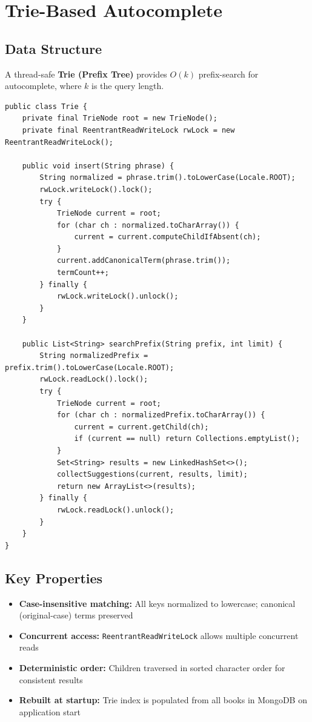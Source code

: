 \documentclass[12pt,a4paper]{report}
\begin{document}
\section{Trie-Based Autocomplete}

\subsection{Data Structure}
A thread-safe \textbf{Trie (Prefix Tree)} provides $O(k)$ prefix-search for autocomplete, where $k$ is the query length.

\begin{lstlisting}[style=JavaStyle, caption={Trie.java -- Thread-Safe Prefix Tree}]
public class Trie {
    private final TrieNode root = new TrieNode();
    private final ReentrantReadWriteLock rwLock = new ReentrantReadWriteLock();

    public void insert(String phrase) {
        String normalized = phrase.trim().toLowerCase(Locale.ROOT);
        rwLock.writeLock().lock();
        try {
            TrieNode current = root;
            for (char ch : normalized.toCharArray()) {
                current = current.computeChildIfAbsent(ch);
            }
            current.addCanonicalTerm(phrase.trim());
            termCount++;
        } finally {
            rwLock.writeLock().unlock();
        }
    }

    public List<String> searchPrefix(String prefix, int limit) {
        String normalizedPrefix = prefix.trim().toLowerCase(Locale.ROOT);
        rwLock.readLock().lock();
        try {
            TrieNode current = root;
            for (char ch : normalizedPrefix.toCharArray()) {
                current = current.getChild(ch);
                if (current == null) return Collections.emptyList();
            }
            Set<String> results = new LinkedHashSet<>();
            collectSuggestions(current, results, limit);
            return new ArrayList<>(results);
        } finally {
            rwLock.readLock().unlock();
        }
    }
}
\end{lstlisting}

\subsection{Key Properties}
\begin{itemize}[noitemsep]
    \item \textbf{Case-insensitive matching:} All keys normalized to lowercase; canonical (original-case) terms preserved
    \item \textbf{Concurrent access:} \texttt{ReentrantReadWriteLock} allows multiple concurrent reads
    \item \textbf{Deterministic order:} Children traversed in sorted character order for consistent results
    \item \textbf{Rebuilt at startup:} Trie index is populated from all books in MongoDB on application start
\end{itemize}
\end{document}
